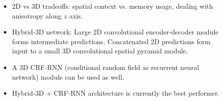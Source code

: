 \documentclass[final]{beamer}
\newlength{\sepwid}
\newlength{\onecolwid}
\renewcommand{\emph}[1]{{\color{nibib2} #1}}
\begin{document}
\begin{frame}[t]
\begin{columns}[t]
\begin{column}{\onecolwid}
\begin{tcolorbox}[title=Hybrid-3D Networks]
\begin{itemize}
\item \emph{2D vs 3D} tradeoffs: spatial context vs. memory usage, dealing with anisotropy along $z$ axis.
\item \emph{Hybrid-3D network}: Large 2D convolutional encoder-decoder module  forms intermediate predictions. Concatenated 2D predictions form input to a small 3D convolutional spatial pyramid module.
\item A 3D \emph{CRF-RNN} (conditional random field as recurrent neural network) module can be used as well.
\item Hybrid-3D + CRF-RNN architecture is currently the best performer.
\end{itemize}
\end{tcolorbox}

\end{column}


\begin{column}{\sepwid}\end{column} %


\begin{column}{\onecolwid}


\end{column}
\end{columns}
\end{frame}
\end{document}
